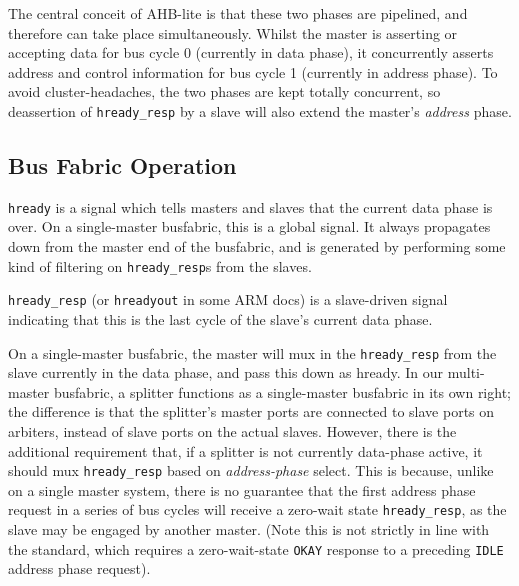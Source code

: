 \documentclass{article}
\begin{document}
The central conceit of AHB-lite is that these two phases are pipelined, and therefore can take place simultaneously. Whilst the master is asserting or accepting data for bus cycle 0 (currently in data phase), it concurrently asserts address and control information for bus cycle 1 (currently in address phase). To avoid cluster-headaches, the two phases are kept totally concurrent, so deassertion of \texttt{hready\_resp} by a slave will also extend the master's \textit{address} phase.


\subsection{Bus Fabric Operation}

\texttt{hready} is a signal which tells masters and slaves that the current data phase is over. On a single-master busfabric, this is a global signal. It always propagates down from the master end of the busfabric, and is generated by performing some kind of filtering on \texttt{hready\_resp}s from the slaves.

\texttt{hready\_resp} (or \texttt{hreadyout} in some ARM docs) is a slave-driven signal indicating that this is the last cycle of the slave's current data phase.

On a single-master busfabric, the master will mux in the \texttt{hready\_resp} from the slave currently in the data phase, and pass this down as hready.  In our multi-master busfabric, a splitter functions as a single-master busfabric in its own right; the difference is that the splitter's master ports are connected to slave ports on arbiters, instead of slave ports on the actual slaves.  However, there is the additional requirement that, if a splitter is not currently data-phase active, it should mux \texttt{hready\_resp} based on \textit{address-phase} select. This is because, unlike on a single master system, there is no guarantee that the first address phase request in a series of bus cycles will receive a zero-wait state \texttt{hready\_resp}, as the slave may be engaged by another master. (Note this is not strictly in line with the standard, which requires a zero-wait-state \texttt{OKAY} response to a preceding \texttt{IDLE} address phase request).
\end{document}
